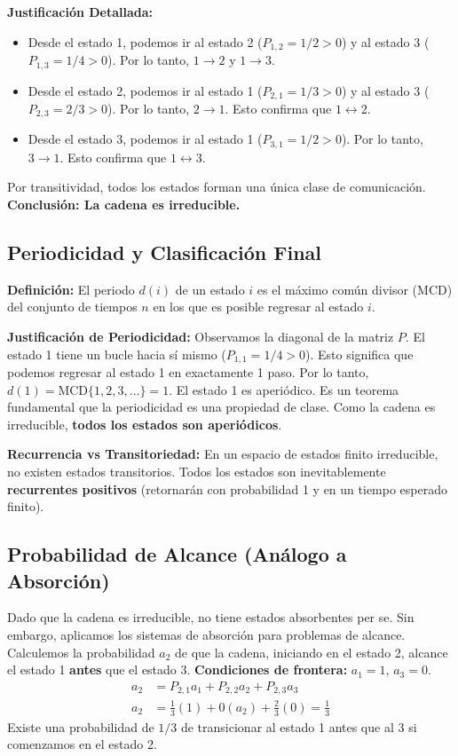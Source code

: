 \documentclass[12pt, a4paper]{article}
\begin{document}
\textbf{Justificación Detallada:}
\begin{itemize}
    \item Desde el estado 1, podemos ir al estado 2 ($P_{1,2} = 1/2 > 0$) y al estado 3 ($P_{1,3} = 1/4 > 0$). Por lo tanto, $1 \to 2$ y $1 \to 3$.
    \item Desde el estado 2, podemos ir al estado 1 ($P_{2,1} = 1/3 > 0$) y al estado 3 ($P_{2,3} = 2/3 > 0$). Por lo tanto, $2 \to 1$. Esto confirma que $1 \leftrightarrow 2$.
    \item Desde el estado 3, podemos ir al estado 1 ($P_{3,1} = 1/2 > 0$). Por lo tanto, $3 \to 1$. Esto confirma que $1 \leftrightarrow 3$.
\end{itemize}
Por transitividad, todos los estados forman una única clase de comunicación. \textbf{Conclusión: La cadena es irreducible.}

\subsection{Periodicidad y Clasificación Final}
\textbf{Definición:} El periodo $d(i)$ de un estado $i$ es el máximo común divisor (MCD) del conjunto de tiempos $n$ en los que es posible regresar al estado $i$.

\textbf{Justificación de Periodicidad:}
Observamos la diagonal de la matriz $P$. El estado 1 tiene un bucle hacia sí mismo ($P_{1,1} = 1/4 > 0$). Esto significa que podemos regresar al estado 1 en exactamente 1 paso. Por lo tanto, $d(1) = \text{MCD}\{1, 2, 3, \dots\} = 1$. El estado 1 es aperiódico.
Es un teorema fundamental que la periodicidad es una propiedad de clase. Como la cadena es irreducible, \textbf{todos los estados son aperiódicos}.

\textbf{Recurrencia vs Transitoriedad:} En un espacio de estados finito irreducible, no existen estados transitorios. Todos los estados son inevitablemente \textbf{recurrentes positivos} (retornarán con probabilidad 1 y en un tiempo esperado finito).

\subsection{Probabilidad de Alcance (Análogo a Absorción)}
Dado que la cadena es irreducible, no tiene estados absorbentes per se. Sin embargo, aplicamos los sistemas de absorción para problemas de alcance. Calculemos la probabilidad $a_2$ de que la cadena, iniciando en el estado 2, alcance el estado 1 \textbf{antes} que el estado 3.
\textbf{Condiciones de frontera:} $a_1 = 1$, $a_3 = 0$.
\begin{align}
    a_2 &= P_{2,1}a_1 + P_{2,2}a_2 + P_{2,3}a_3 \\
    a_2 &= \frac{1}{3}(1) + 0(a_2) + \frac{2}{3}(0) = \frac{1}{3}
\end{align}
Existe una probabilidad de $1/3$ de transicionar al estado 1 antes que al 3 si comenzamos en el estado 2.
\end{document}
